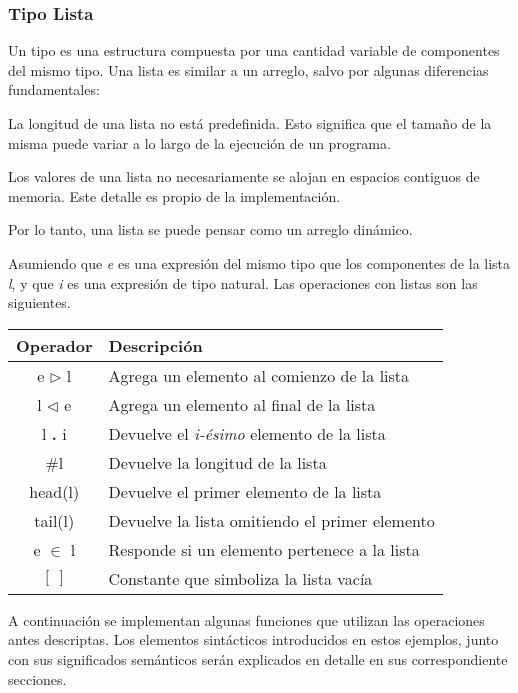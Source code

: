 \documentclass{article}
\begin{document}
\subsubsection{Tipo Lista}

Un tipo  es una estructura compuesta por una cantidad variable de componentes del mismo tipo.
Una lista es similar a un arreglo, salvo por algunas diferencias fundamentales:
\begin{enumerate*}
\item La longitud de una lista no está predefinida.
Esto significa que el tamaño de la misma puede variar a lo largo de la ejecución de un programa.
\item Los valores de una lista no necesariamente se alojan en espacios contiguos de memoria.
Este detalle es propio de la implementación.
\end{enumerate*}
Por lo tanto, una lista se puede pensar como un arreglo dinámico.

Asumiendo que \textit{e} es una expresión del mismo tipo que los componentes de la lista \textit{l}, y que \textit{i} es una expresión de tipo natural.
Las operaciones con listas son las siguientes.

\begin{center}
\begin{tabular}{| c | l |}
\hline
     Operador & Descripción  \\
     \hline
     e $\triangleright$ l & Agrega un elemento al comienzo de la lista \\
     l $\triangleleft$ e & Agrega un elemento al final de la lista \\
     l \textbf{.} i & Devuelve el \textit{i-ésimo} elemento de la lista \\
     \#l & Devuelve la longitud de la lista \\
     head(l) & Devuelve el primer elemento de la lista \\
     tail(l) & Devuelve la lista omitiendo el primer elemento \\
     e $\in$ l & Responde si un elemento pertenece a la lista \\
     $[\ ]$ & Constante que simboliza la lista vacía \\
\hline
\end{tabular}
\end{center}

A continuación se implementan algunas funciones que utilizan las operaciones antes descriptas.
Los elementos sintácticos introducidos en estos ejemplos, junto con sus significados semánticos serán explicados en detalle en sus correspondiente secciones.
\end{document}
